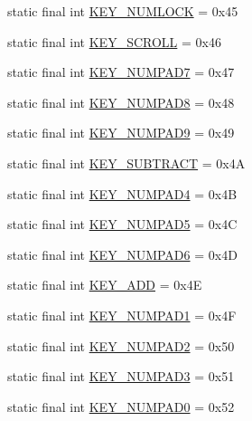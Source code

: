 \begin{DoxyCompactItemize}
static final int \mbox{\hyperlink{classorg_1_1newdawn_1_1slick_1_1_input_a80a6d9ec35d82914777ffa70d4b36bf0}{K\+E\+Y\+\_\+\+N\+U\+M\+L\+O\+CK}} = 0x45
\item 
static final int \mbox{\hyperlink{classorg_1_1newdawn_1_1slick_1_1_input_af4dc0741e5b2d51b6c21afb5f6aea23a}{K\+E\+Y\+\_\+\+S\+C\+R\+O\+LL}} = 0x46
\item 
static final int \mbox{\hyperlink{classorg_1_1newdawn_1_1slick_1_1_input_ad2f4f2e5a0d8bd3a575bbed1e92c3ddc}{K\+E\+Y\+\_\+\+N\+U\+M\+P\+A\+D7}} = 0x47
\item 
static final int \mbox{\hyperlink{classorg_1_1newdawn_1_1slick_1_1_input_a9192d1992ec9a4e94d57f9f5768345ea}{K\+E\+Y\+\_\+\+N\+U\+M\+P\+A\+D8}} = 0x48
\item 
static final int \mbox{\hyperlink{classorg_1_1newdawn_1_1slick_1_1_input_a5a72c950e6417909a6a067c8b5c08ea9}{K\+E\+Y\+\_\+\+N\+U\+M\+P\+A\+D9}} = 0x49
\item 
static final int \mbox{\hyperlink{classorg_1_1newdawn_1_1slick_1_1_input_ac686a0916c0ce1b5a29be273d099f86d}{K\+E\+Y\+\_\+\+S\+U\+B\+T\+R\+A\+CT}} = 0x4A
\item 
static final int \mbox{\hyperlink{classorg_1_1newdawn_1_1slick_1_1_input_a4056bacea9e66ec05f0669e8567a62ab}{K\+E\+Y\+\_\+\+N\+U\+M\+P\+A\+D4}} = 0x4B
\item 
static final int \mbox{\hyperlink{classorg_1_1newdawn_1_1slick_1_1_input_a6f4d5d1b86b9e29342a3a6f7f7c8fa83}{K\+E\+Y\+\_\+\+N\+U\+M\+P\+A\+D5}} = 0x4C
\item 
static final int \mbox{\hyperlink{classorg_1_1newdawn_1_1slick_1_1_input_ad226720867e420c871da3347bb51e8ed}{K\+E\+Y\+\_\+\+N\+U\+M\+P\+A\+D6}} = 0x4D
\item 
static final int \mbox{\hyperlink{classorg_1_1newdawn_1_1slick_1_1_input_ac1af8e003a833f0403bd71ad0d563026}{K\+E\+Y\+\_\+\+A\+DD}} = 0x4E
\item 
static final int \mbox{\hyperlink{classorg_1_1newdawn_1_1slick_1_1_input_a3561d85c365f3786f506e4f26c6fc2d0}{K\+E\+Y\+\_\+\+N\+U\+M\+P\+A\+D1}} = 0x4F
\item 
static final int \mbox{\hyperlink{classorg_1_1newdawn_1_1slick_1_1_input_abba20ae0a0087c3a78e8b1c3488eccc4}{K\+E\+Y\+\_\+\+N\+U\+M\+P\+A\+D2}} = 0x50
\item 
static final int \mbox{\hyperlink{classorg_1_1newdawn_1_1slick_1_1_input_af05de7e21dc98f573589a2bc294e258e}{K\+E\+Y\+\_\+\+N\+U\+M\+P\+A\+D3}} = 0x51
\item 
static final int \mbox{\hyperlink{classorg_1_1newdawn_1_1slick_1_1_input_aae2997f21376e003d2b4d8434a84d08c}{K\+E\+Y\+\_\+\+N\+U\+M\+P\+A\+D0}} = 0x52

\end{DoxyCompactItemize}
